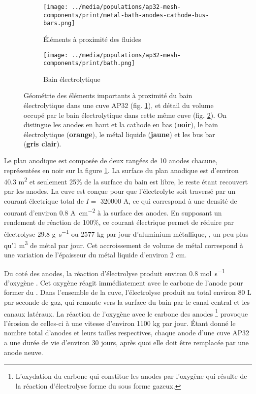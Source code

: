 \begin{figure}[h!]
  \begin{center}
    \begin{subfigure}[b]{0.49\textwidth}
      \texttt{[image: ../media/populations/ap32-mesh-components/print/metal-bath-anodes-cathode-bus-bars.png]}
      \caption{Éléments à proximité des fluides}
      \label{fig:ap32-geometry-elements}
    \end{subfigure}
%
    \begin{subfigure}[b]{0.49\textwidth}
      \texttt{[image: ../media/populations/ap32-mesh-components/print/bath.png]}
      \caption{Bain électrolytique}
      \label{fig:ap32-geometry-electrolyte}
    \end{subfigure}
%
    \caption{Géométrie des éléments importants à proximité
      du bain électrolytique dans une cuve AP32
      (fig. \ref{fig:ap32-geometry-elements}), et détail du volume
      occupé par le bain électrolytique dans cette même cuve
      (fig. \ref{fig:ap32-geometry-electrolyte}). On distingue
      les anodes en haut et la cathode
      en bas (\textbf{noir}), le bain électrolytique
      (\textbf{orange}), le métal liquide (\textbf{jaune}) et les
      bus bar (\textbf{gris clair}).}
    \label{fig:ap32-geometry}
  \end{center}
\end{figure}

Le plan anodique est composée de deux rangées de 10 anodes chacune,
représentées en noir sur la figure \ref{fig:ap32-geometry-elements}. La
surface du plan anodique est d'environ \num{40.3} \si{\square\meter}
et seulement \num{25}\% de la surface du bain est libre, le reste
étant recouvert par les anodes. La cuve est conçue pour que
l'électrolyte soit traversé par un courant électrique total de $I = $
\num{320000} \si{\ampere}, ce qui correspond à une densité de courant
d'environ \num{0.8} \si{\ampere\per\square\centi\meter} à la surface
des anodes. En supposant un rendement de réaction de \num{100}\%, ce
courant électrique permet de réduire par électrolyse \num{29.8}
\si{\gram\per\second} ou \num{2577} \si{\kilo\gram} par jour
d'aluminium métallique, \ie, un peu plus qu'\num{1} \si{\cubic\meter}
de métal par jour. Cet accroissement de volume de métal correspond à
une variation de l'épaisseur du métal liquide d'environ \num{2}
\si{\centi\meter}.

Du coté des anodes, la réaction d'électrolyse produit environ
\num{0.8} \si{\mol\per\second} d'oxygène . Cet oxygène réagit
immédiatement avec le carbone de l'anode pour former du . Dans
l'ensemble de la cuve, l'électrolyse produit au total environ \num{80}
\si{\liter} par seconde de gaz, qui remonte vers la surface du bain
par le canal central et les canaux latéraux. La réaction de l'oxygène
avec le carbone des anodes \footnote{L'oxydation du carbone qui
  constitue les anodes par l'oxygène qui résulte de la réaction
  d'électrolyse forme du  sous forme gazeux.} provoque
l'érosion de celles-ci à une vitesse d'environ \num{1100}
\si{\kilo\gram} par jour. Étant donné le nombre total d'anodes et leurs
tailles respectives, chaque anode d'une cuve AP32 a une durée de vie
d'environ 30 jours, après quoi elle doit être remplacée par une anode
neuve.

